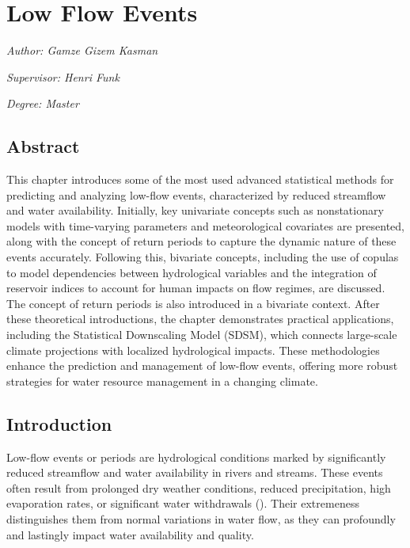 \documentclass[
]{krantz}
\begin{document}
\chapter{Low Flow Events}\label{lfe}

\emph{Author: Gamze Gizem Kasman}

\emph{Supervisor: Henri Funk}

\emph{Degree: Master}

\section{Abstract}\label{abstract-3}

This chapter introduces some of the most used advanced statistical methods for predicting and analyzing low-flow events, characterized by reduced streamflow and water availability. Initially, key univariate concepts such as nonstationary models with time-varying parameters and meteorological covariates are presented, along with the concept of return periods to capture the dynamic nature of these events accurately. Following this, bivariate concepts, including the use of copulas to model dependencies between hydrological variables and the integration of reservoir indices to account for human impacts on flow regimes, are discussed. The concept of return periods is also introduced in a bivariate context. After these theoretical introductions, the chapter demonstrates practical applications, including the Statistical Downscaling Model (SDSM), which connects large-scale climate projections with localized hydrological impacts. These methodologies enhance the prediction and management of low-flow events, offering more robust strategies for water resource management in a changing climate.

\section{Introduction}\label{introduction-4}

Low-flow events or periods are hydrological conditions marked by significantly reduced streamflow and water availability in rivers and streams. These events often result from prolonged dry weather conditions, reduced precipitation, high evaporation rates, or significant water withdrawals (\citet{Smakhtin2001}). Their extremeness distinguishes them from normal variations in water flow, as they can profoundly and lastingly impact water availability and quality.
\end{document}
